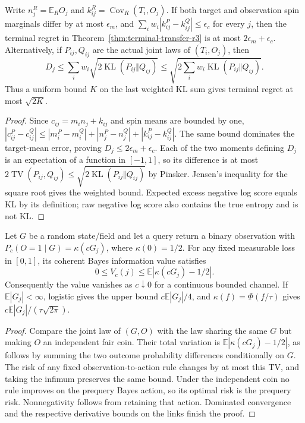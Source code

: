 \begin{proposition}
\label{prop:cov-kl-r3}
Write $n_j^R=\mathbb E_R O_j$ and
$k_{ij}^R=\operatorname{Cov}_R(T_i,O_j)$. If both target and observation
spin marginals differ by at most $\epsilon_m$, and
$\sum_iw_i|k_{ij}^P-k_{ij}^Q|\le\epsilon_c$ for every $j$, then
the terminal regret in Theorem~\ref{thm:terminal-transfer-r3} is at most
$2\epsilon_m+\epsilon_c$.
Alternatively, if $P_{ij},Q_{ij}$ are the actual joint laws of
$(T_i,O_j)$, then
\[
 D_j\le\sum_iw_i\sqrt{2\operatorname{KL}(P_{ij}\Vert Q_{ij})}
 \le\sqrt{2\sum_iw_i\operatorname{KL}(P_{ij}\Vert Q_{ij})}.
\]
Thus a uniform bound $K$ on the last weighted KL sum gives terminal
regret at most $\sqrt{2K}$.
\end{proposition}
\begin{proof}
Since $c_{ij}=m_i n_j+k_{ij}$ and spin means are bounded by one,
$|c_{ij}^P-c_{ij}^Q|\le |m_i^P-m_i^Q|+|n_j^P-n_j^Q|
+|k_{ij}^P-k_{ij}^Q|$. The same bound dominates the target-mean
error, proving $D_j\le2\epsilon_m+\epsilon_c$.
Each of the two moments defining $D_j$ is an expectation of a
function in $[-1,1]$, so its difference is at most $2\operatorname{TV}
(P_{ij},Q_{ij})\le\sqrt{2\operatorname{KL}(P_{ij}\Vert Q_{ij})}$
by Pinsker. Jensen's inequality for the square root gives the weighted
bound. Expected excess negative log score equals KL by its definition;
raw negative log score also contains the true entropy and is not KL.
\end{proof}

\begin{proposition}
\label{prop:bounded-scale-r3}
Let $G$ be a random state/field and let a query return a binary observation
with $P_c(O=1\mid G)=\kappa(cG_j)$, where $\kappa(0)=1/2$.
For any fixed measurable loss in $[0,1]$, its coherent Bayes information
value satisfies
\[
 0\le V_c(j)\le\mathbb E|\kappa(cG_j)-1/2|.
\]
Consequently the value vanishes as $c\downarrow0$ for a continuous
bounded channel. If $\mathbb E|G_j|<\infty$, logistic gives the upper
bound $c\mathbb E|G_j|/4$, and $\kappa(f)=\Phi(f/\tau)$ gives
$c\mathbb E|G_j|/(\tau\sqrt{2\pi})$.
\end{proposition}
\begin{proof}
Compare the joint law of $(G,O)$ with the law sharing the same $G$
but making $O$ an independent fair coin. Their total variation is
$\mathbb E|\kappa(cG_j)-1/2|$, as follows by summing the two outcome
probability differences conditionally on $G$. The risk of any fixed
observation-to-action rule changes by at most this TV, and taking the
infimum preserves the same bound. Under the independent coin no rule
improves on the prequery Bayes action, so its optimal risk is the
prequery risk. Nonnegativity follows from retaining that action.
Dominated convergence and the respective derivative bounds on the
links finish the proof.
\end{proof}

